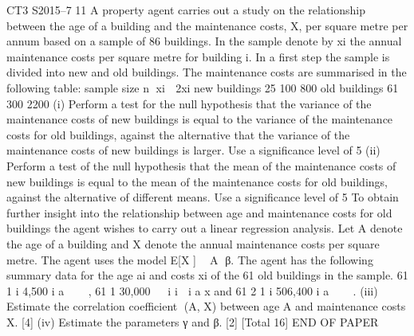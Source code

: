 \documentclass[a4paper,12pt]{article}
\begin{document}
\begin{enumerate}

CT3 S2015–7
11 A property agent carries out a study on the relationship between the age of a building
and the maintenance costs, X, per square metre per annum based on a sample of 86
buildings. In the sample denote by xi the annual maintenance costs per square metre
for building i. In a first step the sample is divided into new and old buildings. The
maintenance costs are summarised in the following table:
  sample size n xi  2xi
new buildings 25 100 800
old buildings 61 300 2200
(i) Perform a test for the null hypothesis that the variance of the maintenance
costs of new buildings is equal to the variance of the maintenance costs for old
buildings, against the alternative that the variance of the maintenance costs of
new buildings is larger. Use a significance level of 5%
(ii) Perform a test of the null hypothesis that the mean of the maintenance costs of
new buildings is equal to the mean of the maintenance costs for old buildings,
against the alternative of different means. Use a significance level of 5%
To obtain further insight into the relationship between age and maintenance costs for
old buildings the agent wishes to carry out a linear regression analysis. Let A denote
the age of a building and X denote the annual maintenance costs per square metre.
The agent uses the model E[X ]  A β. The agent has the following summary data
for the age ai and costs xi of the 61 old buildings in the sample.
61
1
i 4,500
i
a

  ,
61
1
30,000

 i i 
i
a x and
61
2
1
i 506,400
i
a

  .
(iii) Estimate the correlation coefficient (A, X) between age A and maintenance
costs X. [4]
(iv) Estimate the parameters γ and β. [2]
[Total 16]
END OF PAPER


\end{enumerate}
\end{document}

